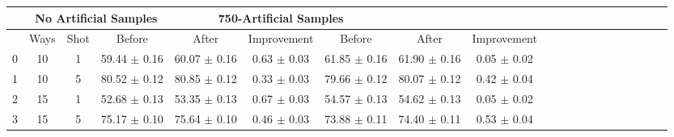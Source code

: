 \begin{tabular}{|c|c|c|c|c|c|c|c|c|c|c|c|c|c|c|c|c|c|c|c}
\toprule
{} & \multicolumn{3}{c|}{No Artificial Samples} & \multicolumn{3}{c|}{750-Artificial Samples} \\\midrule
{} & Ways & Shot &                Before &           After &    Improvement &                 Before &           After &    Improvement \\\midrule
\midrule
0 &   10 &    1 &        59.44 $\pm$ 0.16 &  60.07 $\pm$ 0.16 &  0.63 $\pm$ 0.03 &         61.85 $\pm$ 0.16 &  61.90 $\pm$ 0.16 &  0.05 $\pm$ 0.02 \\\midrule
1 &   10 &    5 &        80.52 $\pm$ 0.12 &  80.85 $\pm$ 0.12 &  0.33 $\pm$ 0.03 &         79.66 $\pm$ 0.12 &  80.07 $\pm$ 0.12 &  0.42 $\pm$ 0.04 \\\midrule
2 &   15 &    1 &        52.68 $\pm$ 0.13 &  53.35 $\pm$ 0.13 &  0.67 $\pm$ 0.03 &         54.57 $\pm$ 0.13 &  54.62 $\pm$ 0.13 &  0.05 $\pm$ 0.02 \\\midrule
3 &   15 &    5 &        75.17 $\pm$ 0.10 &  75.64 $\pm$ 0.10 &  0.46 $\pm$ 0.03 &         73.88 $\pm$ 0.11 &  74.40 $\pm$ 0.11 &  0.53 $\pm$ 0.04 \\\midrule
\bottomrule
\end{tabular}
